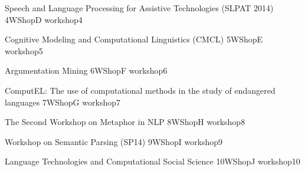 \begin{wsschedule}
  {Speech and Language Processing for Assistive Technologies (SLPAT 2014)}
  {4}{WShopD}
  {workshop4}
  {\WShopLocD}
  
\end{wsschedule}
\begin{wsschedule}
  {Cognitive Modeling and Computational Linguistics (CMCL)}
  {5}{WShopE}
  {workshop5}
  {\WShopLocE}
  
\end{wsschedule}
\begin{wsschedule}
  {Argumentation Mining}
  {6}{WShopF}
  {workshop6}
  {\WShopLocF}
  
\end{wsschedule}
\begin{wsschedule}
  {ComputEL: The use of computational methods in the study of endangered languages}
  {7}{WShopG}
  {workshop7}
  {\WShopLocG}
  
\end{wsschedule}
\begin{wsschedule}
  {The Second Workshop on Metaphor in NLP}
  {8}{WShopH}
  {workshop8}
  {\WShopLocH}
  
\end{wsschedule}
\begin{wsschedule}
  {Workshop on Semantic Parsing (SP14)}
  {9}{WShopI}
  {workshop9}
  {\WShopLocI}
  
\end{wsschedule}
\begin{wsschedule}
  {Language Technologies and Computational Social Science}
  {10}{WShopJ}
  {workshop10}
  {\WShopLocJ}
  
\end{wsschedule}



